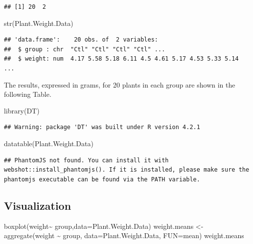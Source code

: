 \documentclass[
]{book}
\newenvironment{Shaded}{\begin{snugshade}}{\end{snugshade}}
\newcommand{\AttributeTok}[1]{\textcolor[rgb]{0.77,0.63,0.00}{#1}}
\newcommand{\FunctionTok}[1]{\textcolor[rgb]{0.00,0.00,0.00}{#1}}
\newcommand{\NormalTok}[1]{#1}
\newcommand{\OtherTok}[1]{\textcolor[rgb]{0.56,0.35,0.01}{#1}}
\newcommand{\SpecialCharTok}[1]{\textcolor[rgb]{0.00,0.00,0.00}{#1}}
\begin{document}
\begin{verbatim}
## [1] 20  2
\end{verbatim}

\begin{Shaded}
\begin{Highlighting}[]
\FunctionTok{str}\NormalTok{(Plant.Weight.Data)}
\end{Highlighting}
\end{Shaded}

\begin{verbatim}
## 'data.frame':    20 obs. of  2 variables:
##  $ group : chr  "Ctl" "Ctl" "Ctl" "Ctl" ...
##  $ weight: num  4.17 5.58 5.18 6.11 4.5 4.61 5.17 4.53 5.33 5.14 ...
\end{verbatim}

The results, expressed in grams, for 20 plants in each group are shown in the following Table.

\begin{Shaded}
\begin{Highlighting}[]
\FunctionTok{library}\NormalTok{(DT)}
\end{Highlighting}
\end{Shaded}

\begin{verbatim}
## Warning: package 'DT' was built under R version 4.2.1
\end{verbatim}

\begin{Shaded}
\begin{Highlighting}[]
\FunctionTok{datatable}\NormalTok{(Plant.Weight.Data)}
\end{Highlighting}
\end{Shaded}

\begin{verbatim}
## PhantomJS not found. You can install it with webshot::install_phantomjs(). If it is installed, please make sure the phantomjs executable can be found via the PATH variable.
\end{verbatim}

\hypertarget{visualization}{%
\subsection{Visualization}\label{visualization}}

\begin{Shaded}
\begin{Highlighting}[]
\FunctionTok{boxplot}\NormalTok{(weight}\SpecialCharTok{\textasciitilde{}}\NormalTok{ group,}\AttributeTok{data=}\NormalTok{Plant.Weight.Data)}
\NormalTok{weight.means }\OtherTok{\textless{}{-}} \FunctionTok{aggregate}\NormalTok{(weight }\SpecialCharTok{\textasciitilde{}}\NormalTok{  group, }\AttributeTok{data=}\NormalTok{Plant.Weight.Data, }\AttributeTok{FUN=}\NormalTok{mean)}
\NormalTok{weight.means}
\end{Highlighting}
\end{Shaded}
\end{document}
